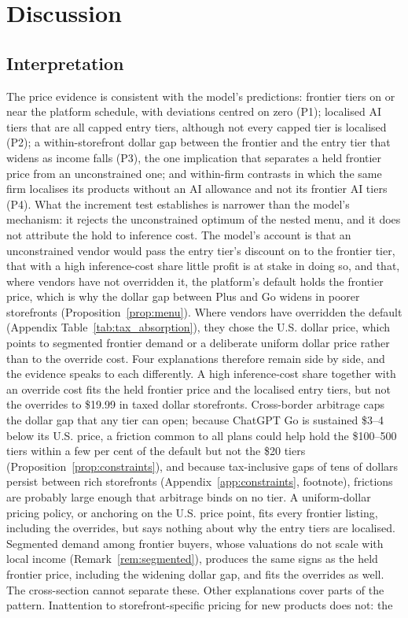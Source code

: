 \documentclass[11pt]{article}
\theoremstyle{definition}
\theoremstyle{remark}
\begin{document}
\section{Discussion}\label{sec:discussion}

\subsection{Interpretation}

The price evidence is consistent with the model's predictions: frontier tiers on or near the platform schedule, with deviations centred on zero (P1); localised AI tiers that are all capped entry tiers, although not every capped tier is localised (P2); a within-storefront dollar gap between the frontier and the entry tier that widens as income falls (P3), the one implication that separates a held frontier price from an unconstrained one; and within-firm contrasts in which the same firm localises its products without an AI allowance and not its frontier AI tiers (P4). What the increment test establishes is narrower than the model's mechanism: it rejects the unconstrained optimum of the nested menu, and it does not attribute the hold to inference cost. The model's account is that an unconstrained vendor would pass the entry tier's discount on to the frontier tier, that with a high inference-cost share little profit is at stake in doing so, and that, where vendors have not overridden it, the platform's default holds the frontier price, which is why the dollar gap between Plus and Go widens in poorer storefronts (Proposition~\ref{prop:menu}). Where vendors have overridden the default (Appendix Table~\ref{tab:tax_absorption}), they chose the U.S. dollar price, which points to segmented frontier demand or a deliberate uniform dollar price rather than to the override cost. Four explanations therefore remain side by side, and the evidence speaks to each differently. A high inference-cost share together with an override cost fits the held frontier price and the localised entry tiers, but not the overrides to \$19.99 in taxed dollar storefronts. Cross-border arbitrage caps the dollar gap that any tier can open; because ChatGPT Go is sustained \$3--4 below its U.S. price, a friction common to all plans could help hold the \$100--500 tiers within a few per cent of the default but not the \$20 tiers (Proposition~\ref{prop:constraints}), and because tax-inclusive gaps of tens of dollars persist between rich storefronts (Appendix~\ref{app:constraints}, footnote), frictions are probably large enough that arbitrage binds on no tier. A uniform-dollar pricing policy, or anchoring on the U.S. price point, fits every frontier listing, including the overrides, but says nothing about why the entry tiers are localised. Segmented demand among frontier buyers, whose valuations do not scale with local income (Remark~\ref{rem:segmented}), produces the same signs as the held frontier price, including the widening dollar gap, and fits the overrides as well. The cross-section cannot separate these. Other explanations cover parts of the pattern. Inattention to storefront-specific pricing for new products does not: the 
\end{document}
